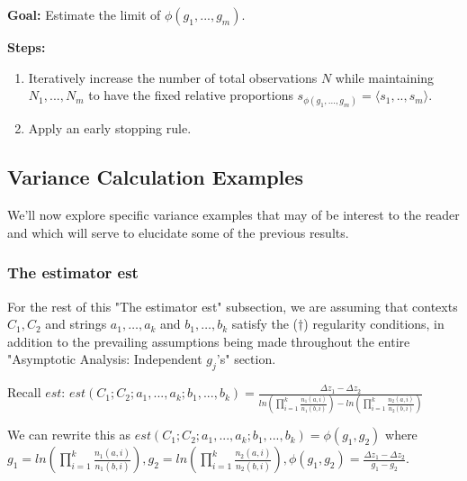 \documentclass{article}
\begin{document}
\textbf{Goal:} Estimate the limit of $\displaystyle \phi \left( g_{1} ,...,g_{m}\right)$.

\textbf{Steps:}
\begin{enumerate}
\item Iteratively increase the number of total observations $\displaystyle N$ while maintaining $\displaystyle N_{1} ,...,N_{m}$ to have the fixed relative proportions $\displaystyle s_{\phi \left( g_{1} ,...,g_{m}\right)} =\langle s_{1} ,..,s_{m} \rangle $.
\item Apply an early stopping rule.
\end{enumerate}



\subsection{Variance Calculation Examples}

We'll now explore specific variance examples that may of be interest to the reader and which will serve to elucidate some of the previous results.



\subsubsection{The estimator est}
\begin{mdframed}
For the rest of this "The estimator est" subsection, we are assuming that contexts $C_1, C_2$ and strings $a_1, \dots, a_k$ and $b_1, \dots, b_k$ satisfy the ($\dagger$) regularity conditions, in addition to the prevailing assumptions being made throughout the entire "Asymptotic Analysis: Independent $g_j$'s" section.
\end{mdframed}

Recall $\displaystyle est$: $\displaystyle est\left( C_{1} ;C_{2} ;a_{1} ,...,a_{k} ;b_{1} ,...,b_{k}\right) =\frac{\Delta z_{1} -\Delta z_{2}}{ln\left(\prod _{i=1}^{k}\frac{n_{1}\left( a,i\right)}{n_{1}\left( b,i\right)}\right) -ln\left(\prod _{i=1}^{k}\frac{n_{2}\left( a,i\right)}{n_{2}\left( b,i\right)}\right)}$



We can rewrite this as $\displaystyle est\left( C_{1} ;C_{2} ;a_{1} ,...,a_{k} ;b_{1} ,...,b_{k}\right) =\phi \left( g_{1} ,g_{2}\right)$ where $\displaystyle g_{1} =ln\left(\prod _{i=1}^{k}\frac{n_{1}\left( a,i\right)}{n_{1}\left( b,i\right)}\right) ,g_{2} =ln\left(\prod _{i=1}^{k}\frac{n_{2}\left( a,i\right)}{n_{2}\left( b,i\right)}\right) ,\phi \left( g_{1} ,g_{2}\right) =\frac{\Delta z_{1} -\Delta z_{2}}{g_{1} -g_{2}}$.
\end{document}
